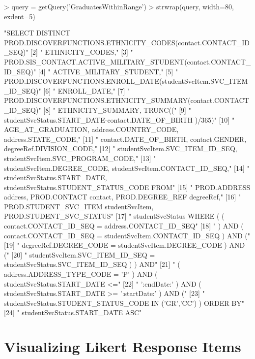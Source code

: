 \documentclass[letterpaper,11pt]{article}
\begin{document}
\begin{Schunk}
\begin{Sinput}
> query = getQuery('GraduatesWithinRange')
> strwrap(query, width=80, exdent=5)
\end{Sinput}
\begin{Soutput}
 [1] "SELECT DISTINCT PROD.DISCOVERFUNCTIONS.ETHNICITY_CODES(contact.CONTACT_ID_SEQ)" 
 [2] "     ETHNICITY_CODES,"                                                          
 [3] "     PROD.SIS_CONTACT.ACTIVE_MILITARY_STUDENT(contact.CONTACT_ID_SEQ)"          
 [4] "     ACTIVE_MILITARY_STUDENT,"                                                  
 [5] "     PROD.DISCOVERFUNCTIONS.ENROLL_DATE(studentSvcItem.SVC_ITEM_ID_SEQ)"        
 [6] "     ENROLL_DATE,"                                                              
 [7] "     PROD.DISCOVERFUNCTIONS.ETHNICITY_SUMMARY(contact.CONTACT_ID_SEQ)"          
 [8] "     ETHNICITY_SUMMARY, TRUNC(("                                                
 [9] "     studentSvcStatus.START_DATE-contact.DATE_OF_BIRTH )/365)"                  
[10] "     AGE_AT_GRADUATION, address.COUNTRY_CODE, address.STATE_CODE,"              
[11] "     contact.DATE_OF_BIRTH, contact.GENDER, degreeRef.DIVISION_CODE,"           
[12] "     studentSvcItem.SVC_ITEM_ID_SEQ, studentSvcItem.SVC_PROGRAM_CODE,"          
[13] "     studentSvcItem.DEGREE_CODE, studentSvcItem.CONTACT_ID_SEQ,"                
[14] "     studentSvcStatus.START_DATE, studentSvcStatus.STUDENT_STATUS_CODE FROM"    
[15] "     PROD.ADDRESS address, PROD.CONTACT contact, PROD.DEGREE_REF degreeRef,"    
[16] "     PROD.STUDENT_SVC_ITEM studentSvcItem, PROD.STUDENT_SVC_STATUS"             
[17] "     studentSvcStatus WHERE ( ( contact.CONTACT_ID_SEQ = address.CONTACT_ID_SEQ"
[18] "     ) AND ( contact.CONTACT_ID_SEQ = studentSvcItem.CONTACT_ID_SEQ ) AND ("    
[19] "     degreeRef.DEGREE_CODE = studentSvcItem.DEGREE_CODE ) AND ("                
[20] "     studentSvcItem.SVC_ITEM_ID_SEQ = studentSvcStatus.SVC_ITEM_ID_SEQ ) ) AND" 
[21] "     ( address.ADDRESS_TYPE_CODE = 'P' ) AND ( studentSvcStatus.START_DATE <="  
[22] "     ':endDate:' ) AND ( studentSvcStatus.START_DATE >= ':startDate:' ) AND ("  
[23] "     studentSvcStatus.STUDENT_STATUS_CODE IN ('GR','CC') ) ORDER BY"            
[24] "     studentSvcStatus.START_DATE ASC"                                           
\end{Soutput}
\end{Schunk}



\section{Visualizing Likert Response Items}
\end{document}
